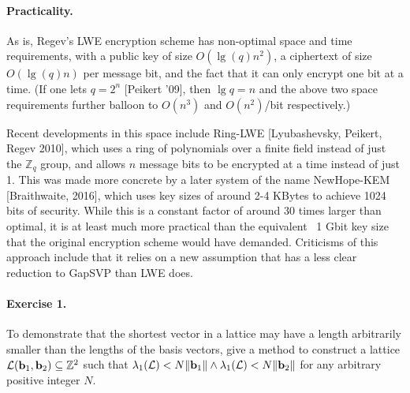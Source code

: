 \paragraph{Practicality.}
As is, Regev's LWE encryption scheme has non-optimal space and time 
requirements, with a public key of size $O(\lg(q)n^2)$, a ciphertext of size 
$O(\lg(q)n)$ per message bit, and the fact that it can only encrypt one bit at a 
time. (If one lets $q = 2^n$ [Peikert '09], then $\lg q = n$ and the above two 
space requirements further balloon to $O(n^3)$ and $O(n^2)$/bit respectively.) 

Recent developments in this space include Ring-LWE [Lyubashevsky, Peikert, Regev 
2010], which uses a ring of polynomials over a finite field instead of just the 
$\mathbb{Z}_q$ group, and allows $n$ message bits to be encrypted at a time 
instead of just 1. This was made more concrete by a later system of the name 
NewHope-KEM [Braithwaite, 2016], which uses key sizes of around 2-4 KBytes to 
achieve 1024 bits of security. While this is a constant factor of around 30 
times larger than optimal, it is at least much more practical than the 
equivalent ~1 Gbit key size that the original encryption scheme would have 
demanded. Criticisms of this approach include that it relies on a new assumption 
that has a less clear reduction to GapSVP than LWE does.

\paragraph{Exercise 1.}
To demonstrate that the shortest vector in a lattice may have a length 
arbitrarily smaller than the lengths of the basis vectors, give a method to 
construct a lattice ${\cal L}({{\bf b}}_1, {{\bf b}}_2) \subseteq \mathbb{Z}^2$ such that 
$\lambda_1({\cal L}) < N\|{{\bf b}}_1\| \wedge \lambda_1({\cal L}) < N\|{{\bf b}}_2\|$ 
for any arbitrary positive integer $N$.

